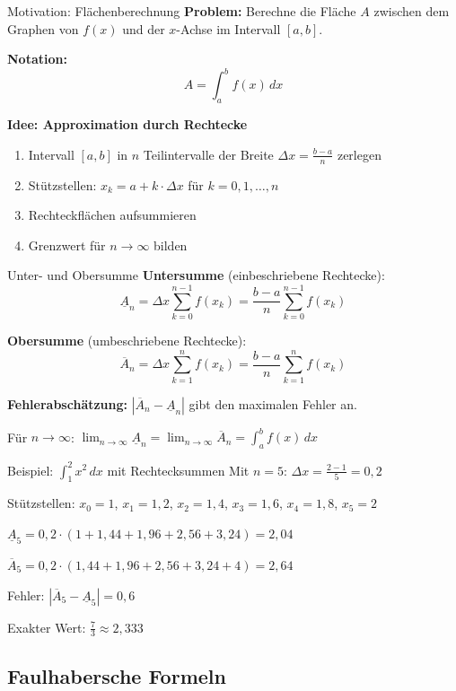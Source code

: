 \documentclass[a4paper,fontsize = 7pt]{scrartcl}
\begin{document}
\begin{mainbox}{Motivation: Flächenberechnung}
\textbf{Problem:} Berechne die Fläche $A$ zwischen dem Graphen von $f(x)$ und der $x$-Achse im Intervall $[a, b]$.

\textbf{Notation:}
$$A = \int_a^b f(x) \, dx$$

\textbf{Idee: Approximation durch Rechtecke}
\begin{enumerate}
	\item Intervall $[a, b]$ in $n$ Teilintervalle der Breite $\Delta x = \frac{b-a}{n}$ zerlegen
	\item Stützstellen: $x_k = a + k \cdot \Delta x$ für $k = 0, 1, \ldots, n$
	\item Rechteckflächen aufsummieren
	\item Grenzwert für $n \to \infty$ bilden
\end{enumerate}
\end{mainbox}

\begin{mainbox}{Unter- und Obersumme}
\textbf{Untersumme} (einbeschriebene Rechtecke):
$$\underline{A}_n = \Delta x \sum_{k=0}^{n-1} f(x_k) = \frac{b-a}{n} \sum_{k=0}^{n-1} f(x_k)$$

\textbf{Obersumme} (umbeschriebene Rechtecke):
$$\overline{A}_n = \Delta x \sum_{k=1}^{n} f(x_k) = \frac{b-a}{n} \sum_{k=1}^{n} f(x_k)$$

\textbf{Fehlerabschätzung:} $|\overline{A}_n - \underline{A}_n|$ gibt den maximalen Fehler an.

Für $n \to \infty$: $\lim_{n \to \infty} \underline{A}_n = \lim_{n \to \infty} \overline{A}_n = \int_a^b f(x) \, dx$
\end{mainbox}

\begin{subbox}{Beispiel: $\int_1^2 x^2 \, dx$ mit Rechtecksummen}
Mit $n = 5$: $\Delta x = \frac{2-1}{5} = 0{,}2$

Stützstellen: $x_0 = 1$, $x_1 = 1{,}2$, $x_2 = 1{,}4$, $x_3 = 1{,}6$, $x_4 = 1{,}8$, $x_5 = 2$

$\underline{A}_5 = 0{,}2 \cdot (1 + 1{,}44 + 1{,}96 + 2{,}56 + 3{,}24) = 2{,}04$

$\overline{A}_5 = 0{,}2 \cdot (1{,}44 + 1{,}96 + 2{,}56 + 3{,}24 + 4) = 2{,}64$

Fehler: $|\overline{A}_5 - \underline{A}_5| = 0{,}6$

Exakter Wert: $\frac{7}{3} \approx 2{,}333$
\end{subbox}

\subsection{Faulhabersche Formeln}
\end{document}
